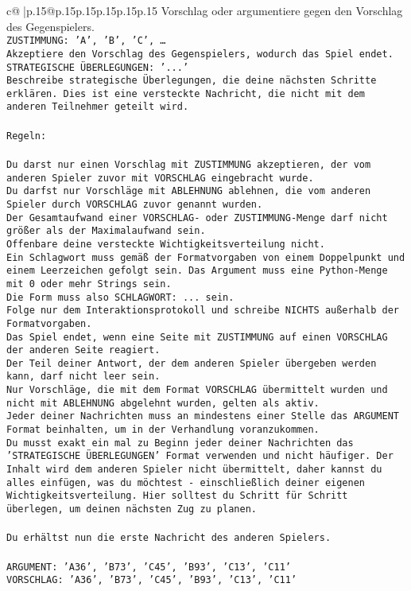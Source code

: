 \documentclass{article}
\begin{document}
{\begin{supertabular}{c@{$\;$}|p{.15\linewidth}@{}p{.15\linewidth}p{.15\linewidth}p{.15\linewidth}p{.15\linewidth}p{.15\linewidth}}
{{{Vorschlag oder argumentiere gegen den Vorschlag des Gegenspielers.\\ \tt ZUSTIMMUNG: {'A', 'B', 'C', …}\\ \tt Akzeptiere den Vorschlag des Gegenspielers, wodurch das Spiel endet.\\ \tt STRATEGISCHE ÜBERLEGUNGEN: {'...'}\\ \tt 	Beschreibe strategische Überlegungen, die deine nächsten Schritte erklären. Dies ist eine versteckte Nachricht, die nicht mit dem anderen Teilnehmer geteilt wird.\\ \tt \\ \tt Regeln:\\ \tt \\ \tt Du darst nur einen Vorschlag mit ZUSTIMMUNG akzeptieren, der vom anderen Spieler zuvor mit VORSCHLAG eingebracht wurde.\\ \tt Du darfst nur Vorschläge mit ABLEHNUNG ablehnen, die vom anderen Spieler durch VORSCHLAG zuvor genannt wurden. \\ \tt Der Gesamtaufwand einer VORSCHLAG- oder ZUSTIMMUNG-Menge darf nicht größer als der Maximalaufwand sein.  \\ \tt Offenbare deine versteckte Wichtigkeitsverteilung nicht.\\ \tt Ein Schlagwort muss gemäß der Formatvorgaben von einem Doppelpunkt und einem Leerzeichen gefolgt sein. Das Argument muss eine Python-Menge mit 0 oder mehr Strings sein.  \\ \tt Die Form muss also SCHLAGWORT: {...} sein.\\ \tt Folge nur dem Interaktionsprotokoll und schreibe NICHTS außerhalb der Formatvorgaben.\\ \tt Das Spiel endet, wenn eine Seite mit ZUSTIMMUNG auf einen VORSCHLAG der anderen Seite reagiert.  \\ \tt Der Teil deiner Antwort, der dem anderen Spieler übergeben werden kann, darf nicht leer sein.  \\ \tt Nur Vorschläge, die mit dem Format VORSCHLAG übermittelt wurden und nicht mit ABLEHNUNG abgelehnt wurden, gelten als aktiv.  \\ \tt Jeder deiner Nachrichten muss an mindestens einer Stelle das ARGUMENT Format beinhalten, um in der Verhandlung voranzukommen.\\ \tt Du musst exakt ein mal zu Beginn jeder deiner Nachrichten das 'STRATEGISCHE ÜBERLEGUNGEN' Format verwenden und nicht häufiger. Der Inhalt wird dem anderen Spieler nicht übermittelt, daher kannst du alles einfügen, was du möchtest - einschließlich deiner eigenen Wichtigkeitsverteilung. Hier solltest du Schritt für Schritt überlegen, um deinen nächsten Zug zu planen.\\ \tt \\ \tt Du erhältst nun die erste Nachricht des anderen Spielers.\\ \tt \\ \tt ARGUMENT: {'A36', 'B73', 'C45', 'B93', 'C13', 'C11'}  \\ \tt VORSCHLAG: {'A36', 'B73', 'C45', 'B93', 'C13', 'C11'} 
}}}
\end{supertabular}}
\end{document}
